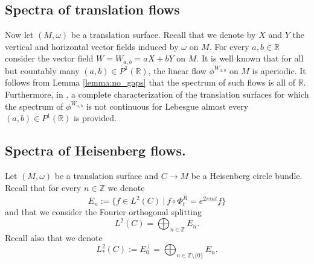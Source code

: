 \documentclass{amsart}
\theoremstyle{definition}
\theoremstyle{remark}
\numberwithin{equation}{section}
\newcommand{\wR}{\widehat{R}}
\newcommand{\<}{{\langle}}
\renewcommand{\>}{{\rangle}}
\newcommand{\field}[1]{\mathbb{#1}}
\newcommand{\R}{\field{R}}
\begin{document}
\subsection{Spectra of translation flows} Now let $(M,\omega)$ be a translation surface. Recall that we denote by $X$ and $Y$ the vertical and horizontal vector fields induced by $\omega$ on $M$. For every $a,b \in \mathbb{R}$ consider the vector field
$W= W_{a,b} = a X+ bY$ on $M$. It is well known that for all but countably many $(a,b)\in P^1(\R)$, the linear flow $\phi^{W_{a,b}}$ on $M$ is aperiodic. It follows from Lemma \ref{lemma:no_gaps}
that the spectrum of such flows is all of $\mathbb{R}$. Furthermore, in \cite{AHCF24}, a complete characterization of the translation surfaces for which the spectrum
of $\phi^{W_{a,b}}$ is not continuous for Lebesgue almost every $(a,b)\in P^1(\R)$ is provided.

\subsection{Spectra of Heisenberg flows.} Let $(M,\omega)$ be a translation surface and $C \to M$ be a Heisenberg circle bundle. Recall that for every $n \in \mathbb{Z}$ we denote
    \[
    E_n := \{f \in L^2(C) \ | \ f \circ \Phi^{\wR}_t = e^{2\pi i n t} f\}
    \]
    and that we consider the Fourier orthogonal splitting
    \begin{equation*}
    L^2(C) = \bigoplus_{n \in \mathbb{Z}} E_n.
    \end{equation*}
    Recall also that we denote
    \[
    L^2_*(C) := E_0^\perp = \bigoplus_{n \in \mathbb{Z} \setminus \{0\}} E_n .
    \]
    
\end{document}
